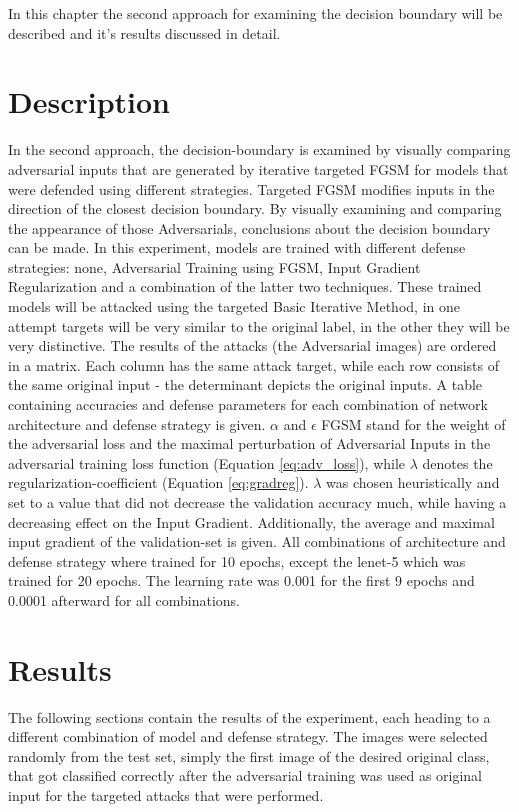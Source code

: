 \documentclass[draft,final]{vutinfth} %
\begin{document}
In this chapter the second approach for examining the decision boundary will be described and it's results discussed in detail.

\section{Description}
In the second approach, the decision-boundary is examined by visually comparing adversarial inputs that are generated by iterative targeted FGSM for models that were defended using different strategies.
Targeted FGSM modifies inputs in the direction of the closest decision boundary.
By visually examining and comparing the appearance of those Adversarials, conclusions about the decision boundary can be made.
In this experiment, models are trained with different defense strategies: none, Adversarial Training using FGSM, Input Gradient Regularization and a combination of the latter two techniques.
These trained models will be attacked using the targeted Basic Iterative Method, in one attempt targets will be very similar to the original label, in the other they will be very distinctive.
The results of the attacks (the Adversarial images) are ordered in a matrix.
Each column has the same attack target, while each row consists of the same original input - the determinant depicts the original inputs.
A table containing accuracies and defense parameters for each combination of network architecture and defense strategy is given.
$\alpha$ and $\epsilon$ FGSM stand for the weight of the adversarial loss and the maximal perturbation of Adversarial Inputs in the adversarial training loss function (Equation \ref{eq:adv_loss}), while $\lambda$ denotes the regularization-coefficient (Equation \ref{eq:gradreg}). $\lambda$ was chosen heuristically and set to a value that did not decrease the validation accuracy much, while having a decreasing effect on the Input Gradient.
Additionally, the average and maximal input gradient of the validation-set is given.
All combinations of architecture and defense strategy where trained for 10 epochs, except the lenet-5 which was trained for 20 epochs.
The learning rate was 0.001 for the first 9 epochs and 0.0001 afterward for all combinations.


\section{Results}

The following sections contain the results of the experiment, each heading to a different combination of model and defense strategy.
The images were selected randomly from the test set, simply the first image of the desired original class, that got classified correctly after the adversarial training was used as original input for the targeted attacks that were performed.
\end{document}
